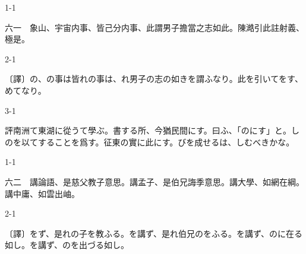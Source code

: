 \documentclass[tate,paper=b6j,jafontsize=9pt]{jlreq}
\begin{document}
\begin{azconvIndented}{1\zw}{-1\zw}

六一　象山、宇宙内事、皆己分内事、此謂男子擔當之志如\azconvKunten{\azconvIR}此。陳澔引此註射義、極是。

\end{azconvIndented}
\begin{azconvIndented}{2\zw}{-1\zw}

〔譯〕の、の事は皆れの事は、れ男子の志の如きを謂ふなり。此を引いてをす、めてなり。

\end{azconvIndented}
\begin{azconvIndented}{3\zw}{-1\zw}

評南洲て東湖に從うて學ぶ。書する所、今猶民間にす。曰ふ、「のにす」と。しのを以てすることを爲す。征東の實に此にす。びを成せるは、しむべきかな。

\end{azconvIndented}

\begin{azconvIndented}{1\zw}{-1\zw}

六二　講論語、是慈父教子意思。講孟子、是伯兄誨季意思。講大學、如網在\azconvKunten{\azconvIR}綱。講中庸、如雲出\azconvKunten{\azconvIR}岫。

\end{azconvIndented}
\begin{azconvIndented}{2\zw}{-1\zw}

〔譯〕をず、是れの子を教ふる。を講ず、是れ伯兄のをふる。を講ず、のに在る如し。を講ず、のを出づる如し。

\end{azconvIndented}
\end{document}
